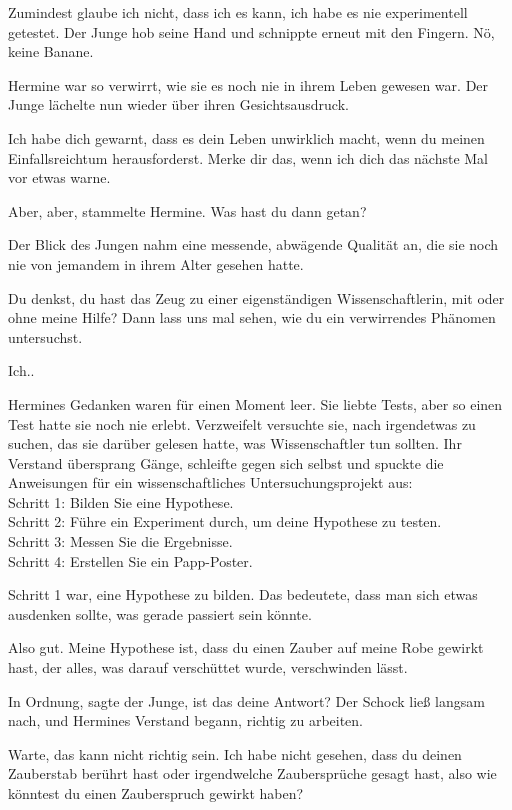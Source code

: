 \glqq Zumindest glaube ich nicht, dass ich es kann, ich habe es nie
experimentell getestet.\grqq{} Der Junge hob seine Hand und schnippte erneut mit
den Fingern. \glqq Nö, keine Banane.\grqq{}

Hermine war so verwirrt, wie sie es noch nie in ihrem Leben gewesen war. Der
Junge lächelte nun wieder über ihren Gesichtsausdruck.

\glqq Ich habe dich gewarnt, dass es dein Leben unwirklich macht, wenn du meinen
Einfallsreichtum herausforderst. Merke dir das, wenn ich dich das nächste Mal
vor etwas warne.\grqq{}

\glqq Aber, aber\grqq{}, stammelte Hermine. \glqq Was hast du dann getan?\grqq{}

Der Blick des Jungen nahm eine messende, abwägende Qualität an, die sie noch nie
von jemandem in ihrem Alter gesehen hatte.

\glqq Du denkst, du hast das Zeug zu einer eigenständigen Wissenschaftlerin, mit
oder ohne meine Hilfe? Dann lass uns mal sehen, wie du ein verwirrendes Phänomen
untersuchst.\grqq{}

\glqq Ich..\grqq{}

Hermines Gedanken waren für einen Moment leer. Sie liebte Tests, aber so einen
Test hatte sie noch nie erlebt. Verzweifelt versuchte sie, nach irgendetwas zu
suchen, das sie darüber gelesen hatte, was Wissenschaftler tun sollten. Ihr
Verstand übersprang Gänge, schleifte gegen sich selbst und spuckte die
Anweisungen für ein wissenschaftliches Untersuchungsprojekt aus:\\
Schritt 1: Bilden Sie eine Hypothese.\\
Schritt 2: Führe ein Experiment durch, um deine Hypothese zu testen.\\
Schritt 3: Messen Sie die Ergebnisse.\\
Schritt 4: Erstellen Sie ein Papp-Poster.

Schritt 1 war, eine Hypothese zu bilden. Das bedeutete, dass man sich etwas
ausdenken sollte, was gerade passiert sein könnte.

\glqq Also gut. Meine Hypothese ist, dass du einen Zauber auf meine Robe gewirkt
hast, der alles, was darauf verschüttet wurde, verschwinden lässt.\grqq{}

\glqq In Ordnung\grqq{}, sagte der Junge, \glqq ist das deine Antwort?\grqq{}
Der Schock ließ langsam nach, und Hermines Verstand begann, richtig zu arbeiten.

\glqq Warte, das kann nicht richtig sein. Ich habe nicht gesehen, dass du deinen
Zauberstab berührt hast oder irgendwelche Zaubersprüche gesagt hast, also wie
könntest du einen Zauberspruch gewirkt haben?\grqq{}

